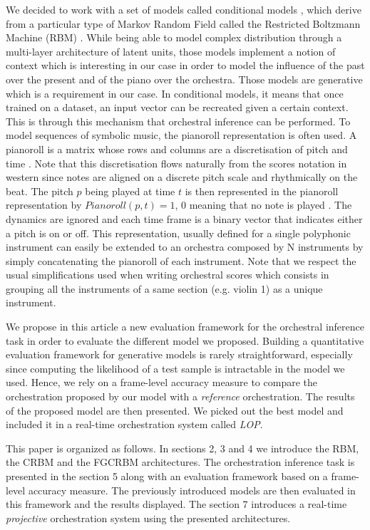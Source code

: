 \documentclass{article} %
\begin{document}
We decided to work with a set of models called conditional models \cite{taylor2009composable}, which derive from a particular type of Markov Random Field called the Restricted Boltzmann Machine (RBM) \cite{fischer2014training}. While being able to model complex distribution through a multi-layer architecture of latent units, those models implement a notion of context which is interesting in our case in order to model the influence of the past over the present and of the piano over the orchestra.
Those models are generative which is a requirement in our case. In conditional models, it means that once trained on a dataset, an input vector can be recreated given a certain context. This is through this mechanism that orchestral inference can be performed.
To model sequences of symbolic music, the pianoroll representation is often used. A pianoroll is a matrix whose rows and columns are a discretisation of pitch and time . Note that this discretisation flows naturally from the scores notation in western since notes are aligned on a discrete pitch scale and rhythmically on the beat. The pitch $p$ being played at time $t$  is then represented in the pianoroll representation by $Pianoroll(p,t) = 1$, $0$ meaning that no note is played . The dynamics are ignored and each time frame is a binary vector that indicates either a pitch is on or off.
\label{sec:orchestral_vect_def}
This representation, usually defined for a single polyphonic instrument can easily be extended to an orchestra composed by N instruments by simply concatenating the pianoroll of each instrument. Note that we respect the usual simplifications used when writing orchestral scores which consists in grouping all the instruments of a same section (e.g. violin 1) as a unique instrument.

We propose in this article a new evaluation framework for the orchestral inference task in order to evaluate the different model we proposed. Building a quantitative evaluation framework for generative models is rarely straightforward, especially since computing the likelihood of a test sample is intractable in the model we used. Hence, we rely on a frame-level accuracy measure to compare the orchestration proposed by our model with a \textit{reference} orchestration.
The results of the proposed model are then presented. We picked out the best model and included it in a real-time orchestration system called \textit{LOP}.

This paper is organized as follows. In sections 2, 3 and 4 we introduce  the RBM, the CRBM and the FGCRBM architectures. The orchestration inference task is presented in the section 5 along with an evaluation framework based on a frame-level accuracy measure. The previously introduced models are then evaluated in this framework and the results displayed. The section 7 introduces a real-time \textit{projective} orchestration system using the presented architectures.
\end{document}
